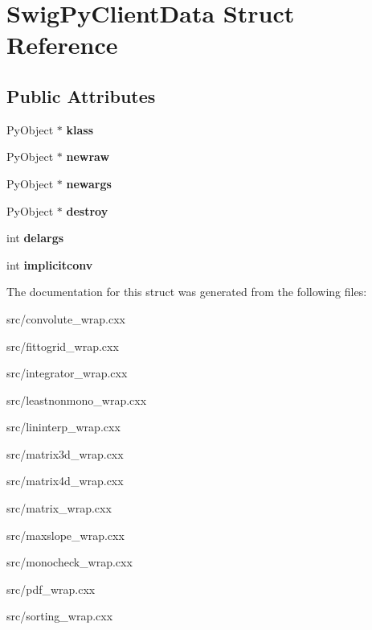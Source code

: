 \hypertarget{structSwigPyClientData}{
\section{SwigPyClientData Struct Reference}
\label{d5/d6b/structSwigPyClientData}
}
\subsection*{Public Attributes}
\begin{DoxyCompactItemize}
\item 
\hypertarget{structSwigPyClientData_afe15f48c719784bf245534c4999ea387}{
PyObject $\ast$ {\bfseries klass}}
\label{d5/d6b/structSwigPyClientData_afe15f48c719784bf245534c4999ea387}

\item 
\hypertarget{structSwigPyClientData_aef35885524e7defa5cbcc00714c4a5c1}{
PyObject $\ast$ {\bfseries newraw}}
\label{d5/d6b/structSwigPyClientData_aef35885524e7defa5cbcc00714c4a5c1}

\item 
\hypertarget{structSwigPyClientData_a8080712504b1249851e64d0baa3926bb}{
PyObject $\ast$ {\bfseries newargs}}
\label{d5/d6b/structSwigPyClientData_a8080712504b1249851e64d0baa3926bb}

\item 
\hypertarget{structSwigPyClientData_a1e3e0efca34cf915f74fdd66ecb9a01e}{
PyObject $\ast$ {\bfseries destroy}}
\label{d5/d6b/structSwigPyClientData_a1e3e0efca34cf915f74fdd66ecb9a01e}

\item 
\hypertarget{structSwigPyClientData_a9cb4b9b02743d09dbe216f304e2b7df0}{
int {\bfseries delargs}}
\label{d5/d6b/structSwigPyClientData_a9cb4b9b02743d09dbe216f304e2b7df0}

\item 
\hypertarget{structSwigPyClientData_a5f9ebdbc04a774559a64b926b6ec4070}{
int {\bfseries implicitconv}}
\label{d5/d6b/structSwigPyClientData_a5f9ebdbc04a774559a64b926b6ec4070}

\end{DoxyCompactItemize}


The documentation for this struct was generated from the following files:\begin{DoxyCompactItemize}
\item 
src/convolute\_\-wrap.cxx\item 
src/fittogrid\_\-wrap.cxx\item 
src/integrator\_\-wrap.cxx\item 
src/leastnonmono\_\-wrap.cxx\item 
src/lininterp\_\-wrap.cxx\item 
src/matrix3d\_\-wrap.cxx\item 
src/matrix4d\_\-wrap.cxx\item 
src/matrix\_\-wrap.cxx\item 
src/maxslope\_\-wrap.cxx\item 
src/monocheck\_\-wrap.cxx\item 
src/pdf\_\-wrap.cxx\item 
src/sorting\_\-wrap.cxx\end{DoxyCompactItemize}
